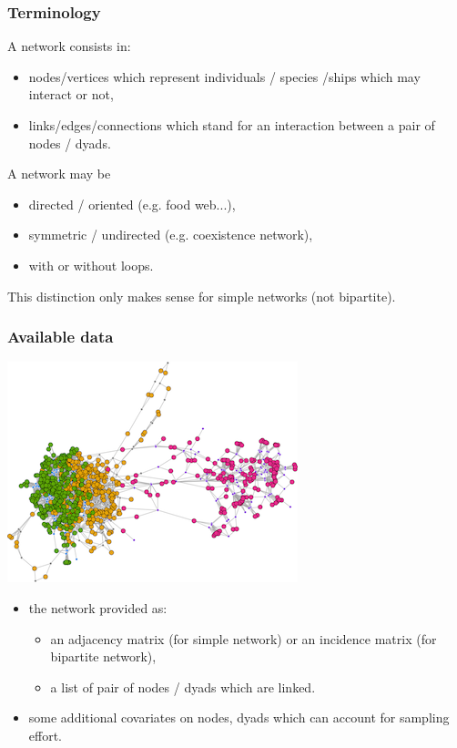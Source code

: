 \documentclass[compress,10pt]{beamer}
\begin{document}
\begin{frame}
 \frametitle{Terminology}
 
 A network consists in:
 \begin{itemize}
  \item nodes/vertices which represent individuals / species /ships which may interact or not,
  \item links/edges/connections which stand for an interaction between a pair of nodes / dyads.
  
 \end{itemize}

\bigskip
 
 A network may be 
 \begin{itemize}
  \item directed / oriented (e.g. food web...),
  \item symmetric / undirected (e.g. coexistence network),
  \item with or without loops.
 \end{itemize}

This distinction only makes sense for simple networks (not bipartite).
 
 
\end{frame}



\begin{frame}
 \frametitle{Available data}

 
\begin{center}
 \includegraphics[scale=.6]{plots/image_SBM.png}
\end{center}

\begin{itemize}
 \item  the network provided as:
\begin{itemize}
 \item an adjacency matrix (for simple network) or an incidence matrix (for bipartite network),
 \item a list of pair of nodes / dyads which are linked.
\end{itemize}

\item some additional covariates on nodes, dyads which can account for sampling effort.
 \end{itemize}






\end{frame}
\end{document}
